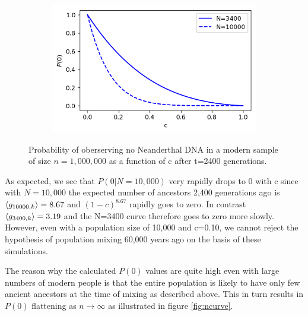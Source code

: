 \documentclass{article}
\begin{document}
\begin{figure}[h]
	\centering
	\begin{subfigure}[t]{0.45\linewidth}
		\centering
		\includegraphics[width = 1.0\linewidth, trim={0 0 0 0}, clip=true]{figures/c_curve.png}
	\end{subfigure}
\caption{Probability of oberserving no Neanderthal DNA in a modern sample of size $n=1,000,000$ as a function of c after t=2400 generations.}
\label{fig:ccurve}
\end{figure}

As expected, we see that $P(0|N=10,000)$ very rapidly drops to 0 with c since with $N=10,000$ the expected number of ancestors 2,400 generations ago is $\braket{g_{10000, k}} = 8.67$ and $(1-c)^{8.67}$ rapidly goes to zero. In contrast $\braket{g_{3400, k}} = 3.19$ and the N=3400 curve therefore goes to zero more slowly. However, even with a population size of 10,000 and c=0.10, we cannot reject the hypothesis of population mixing 60,000 years ago on the basis of these simulations.

The reason why the calculated $P(0)$ values are quite high even with large numbers of modern people is that the entire population is likely to have only few ancient ancestors at the time of mixing as described above. This in turn results in $P(0)$ flattening as $n \rightarrow \infty$ as illustrated in figure \ref{fig:ncurve}.
\end{document}
